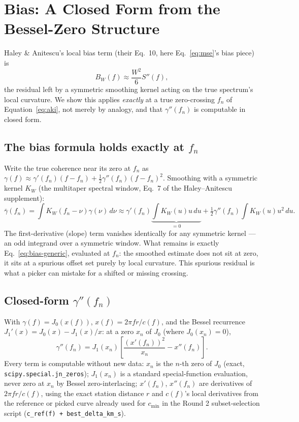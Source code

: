 \documentclass[11pt]{article}
\begin{document}
\section{Bias: A Closed Form from the Bessel-Zero Structure}
\label{sec:bias}

Haley \& Anitescu's local bias term (their Eq.~10, here Eq.~\ref{eq:mse}'s bias piece) is
\begin{equation}
  B_W(f) \approx \frac{W^2}{6}S''(f),
  \label{eq:bias-generic}
\end{equation}
the residual left by a symmetric smoothing kernel acting on the true spectrum's local curvature.
We show this applies \emph{exactly} at a true zero-crossing $f_n$ of Equation~\ref{eq:aki}, not
merely by analogy, and that $\gamma''(f_n)$ is computable in closed form.

\subsection{The bias formula holds exactly at $f_n$}

Write the true coherence near its zero at $f_n$ as $\gamma(f) \approx \gamma'(f_n)(f-f_n) +
\tfrac12\gamma''(f_n)(f-f_n)^2$. Smoothing with a symmetric kernel $K_W$ (the multitaper spectral
window, Eq.~7 of the Haley--Anitescu supplement):
\begin{equation}
  \bar\gamma(f_n) = \int K_W(f_n-\nu)\gamma(\nu)\,d\nu \approx
  \gamma'(f_n)\underbrace{\int K_W(u)u\,du}_{=0} +
  \tfrac12\gamma''(f_n)\int K_W(u)u^2\,du.
\end{equation}
The first-derivative (slope) term vanishes identically for any symmetric kernel --- an odd
integrand over a symmetric window. What remains is exactly Eq.~\ref{eq:bias-generic}, evaluated
at $f_n$: the smoothed estimate does not sit at zero, it sits at a spurious offset set purely by
local curvature. This spurious residual is what a picker can mistake for a shifted or missing
crossing.

\subsection{Closed-form $\gamma''(f_n)$}

With $\gamma(f) = J_0(x(f))$, $x(f) = 2\pi f r/c(f)$, and the Bessel recurrence $J_1'(x) = J_0(x)
- J_1(x)/x$: at a zero $x_n$ of $J_0$ (where $J_0(x_n)=0$),
\begin{equation}
  \gamma''(f_n) = J_1(x_n)\left[\frac{(x'(f_n))^2}{x_n} - x''(f_n)\right].
  \label{eq:gamma-pp}
\end{equation}
Every term is computable without new data: $x_n$ is the $n$-th zero of $J_0$ (exact,
\texttt{scipy.special.jn\_zeros}); $J_1(x_n)$ is a standard special-function evaluation, never
zero at $x_n$ by Bessel zero-interlacing; $x'(f_n)$, $x''(f_n)$ are derivatives of $2\pi f
r/c(f)$, using the exact station distance $r$ and $c(f)$'s local derivatives from the reference
or picked curve already used for $c_{\min}$ in the Round 2 subset-selection script
(\texttt{c\_ref(f) + best\_delta\_km\_s}).
\end{document}
